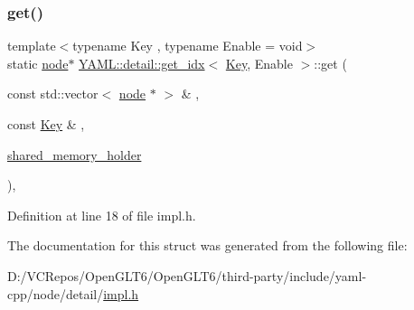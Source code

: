 \subsubsection{\texorpdfstring{get()}{get()}}
{\footnotesize\ttfamily template$<$typename Key , typename Enable  = void$>$ \\
static \mbox{\hyperlink{class_y_a_m_l_1_1detail_1_1node}{node}}$\ast$ \mbox{\hyperlink{struct_y_a_m_l_1_1detail_1_1get__idx}{Y\+A\+M\+L\+::detail\+::get\+\_\+idx}}$<$ \mbox{\hyperlink{namespace_y_a_m_l_a67c320aa50d3de7ecba1d0b8775dd684a1af533fc24b0311b8c4d5ac2870283aa}{Key}}, Enable $>$\+::get (\begin{DoxyParamCaption}\item[{const std\+::vector$<$ \mbox{\hyperlink{class_y_a_m_l_1_1detail_1_1node}{node}} $\ast$ $>$ \&}]{,  }\item[{const \mbox{\hyperlink{namespace_y_a_m_l_a67c320aa50d3de7ecba1d0b8775dd684a1af533fc24b0311b8c4d5ac2870283aa}{Key}} \&}]{,  }\item[{\mbox{\hyperlink{namespace_y_a_m_l_1_1detail_a228c4b3b6ba1058b474d40afc218e21d}{shared\+\_\+memory\+\_\+holder}}}]{ }\end{DoxyParamCaption})\hspace{0.3cm}{\ttfamily [inline]}, {\ttfamily [static]}}



Definition at line 18 of file impl.\+h.



The documentation for this struct was generated from the following file\+:\begin{DoxyCompactItemize}
\item 
D\+:/\+V\+C\+Repos/\+Open\+G\+L\+T6/\+Open\+G\+L\+T6/third-\/party/include/yaml-\/cpp/node/detail/\mbox{\hyperlink{detail_2impl_8h}{impl.\+h}}\end{DoxyCompactItemize}

